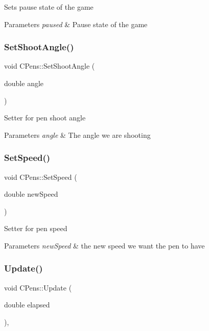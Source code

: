 Sets pause state of the game 
\begin{DoxyParams}{Parameters}
{\em paused} & Pause state of the game \\
\hline
\end{DoxyParams}
\mbox{\label{class_c_pens_a1f2dbffbe8ff484a1c4c2bccf87fddda}} 
\subsubsection{\texorpdfstring{SetShootAngle()}{SetShootAngle()}}
{\footnotesize\ttfamily void C\+Pens\+::\+Set\+Shoot\+Angle (\begin{DoxyParamCaption}\item[{double}]{angle }\end{DoxyParamCaption})\hspace{0.3cm}{\ttfamily [inline]}}

Setter for pen shoot angle 
\begin{DoxyParams}{Parameters}
{\em angle} & The angle we are shooting \\
\hline
\end{DoxyParams}
\mbox{\label{class_c_pens_a5864267ee35a4787de85bc721732f819}} 
\subsubsection{\texorpdfstring{SetSpeed()}{SetSpeed()}}
{\footnotesize\ttfamily void C\+Pens\+::\+Set\+Speed (\begin{DoxyParamCaption}\item[{double}]{new\+Speed }\end{DoxyParamCaption})\hspace{0.3cm}{\ttfamily [inline]}}

Setter for pen speed 
\begin{DoxyParams}{Parameters}
{\em new\+Speed} & the new speed we want the pen to have \\
\hline
\end{DoxyParams}
\mbox{\label{class_c_pens_ae4a11a23cb7a91edc9b222f4b8a2f20f}} 
\subsubsection{\texorpdfstring{Update()}{Update()}}
{\footnotesize\ttfamily void C\+Pens\+::\+Update (\begin{DoxyParamCaption}\item[{double}]{elapsed }\end{DoxyParamCaption})\hspace{0.3cm}{\ttfamily [override]}, {\ttfamily [virtual]}}



